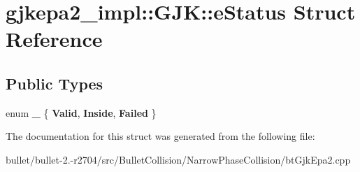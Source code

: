 \hypertarget{structgjkepa2__impl_1_1_g_j_k_1_1e_status}{\section{gjkepa2\+\_\+impl\+:\+:G\+J\+K\+:\+:e\+Status Struct Reference}
\label{structgjkepa2__impl_1_1_g_j_k_1_1e_status}
}
\subsection*{Public Types}
\begin{DoxyCompactItemize}
\item 
\hypertarget{structgjkepa2__impl_1_1_g_j_k_1_1e_status_a56e8a322d66d3609e32ab2ec93725af4}{enum {\bfseries \+\_\+} \{ {\bfseries Valid}, 
{\bfseries Inside}, 
{\bfseries Failed}
 \}}\label{structgjkepa2__impl_1_1_g_j_k_1_1e_status_a56e8a322d66d3609e32ab2ec93725af4}

\end{DoxyCompactItemize}


The documentation for this struct was generated from the following file\+:\begin{DoxyCompactItemize}
\item 
bullet/bullet-\/2.-\/r2704/src/\+Bullet\+Collision/\+Narrow\+Phase\+Collision/bt\+Gjk\+Epa2.\+cpp\end{DoxyCompactItemize}
